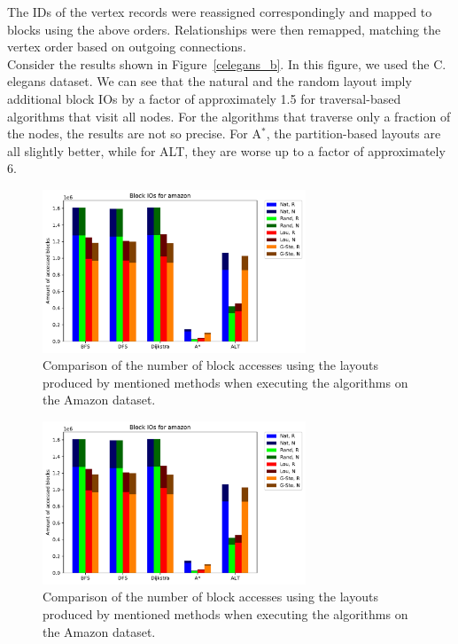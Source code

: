     The IDs of the vertex records were reassigned correspondingly and mapped to blocks using the above orders. 
    Relationships were then remapped, matching the vertex order based on outgoing connections.\\
    Consider the results shown in Figure~\ref{celegans_b}. In this figure, we used the C. elegans dataset.
    We can see that the natural and the random layout imply additional block IOs by a factor of approximately 1.5 for traversal-based algorithms that visit all nodes.
    For the algorithms that traverse only a fraction of the nodes, the results are not so precise. For A$^*$, the partition-based layouts are all slightly better, while for ALT, they are worse up to a factor of approximately 6.
    
    \begin{figure}[htp]
        \begin{center}
            \includegraphics[keepaspectratio,width=0.7\textwidth]{img/07-eval/amazon_Block_unsorted_io_comparison.pdf}
        \end{center}
        \caption{Comparison of the number of block accesses using the layouts produced by mentioned methods when executing the algorithms on the Amazon dataset.} 
        \label{am-b}
    \end{figure}
    \begin{figure}[htp]
        \begin{center}
            \includegraphics[keepaspectratio,width=0.7\textwidth]{img/07-eval/amazon_Block_unsorted_io_comparison.pdf}
        \end{center}
        \caption{Comparison of the number of block accesses using the layouts produced by mentioned methods when executing the algorithms on the Amazon dataset.} 
        \label{am-p}
    \end{figure}
    
